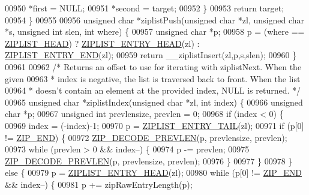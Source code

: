 \begin{DoxyCode}
{{00950         *first = NULL;
00951         *second = target;
00952     \}
00953     \textcolor{keywordflow}{return} target;
00954 \}
00955 
00956 \textcolor{keywordtype}{unsigned} \textcolor{keywordtype}{char} *ziplistPush(\textcolor{keywordtype}{unsigned} \textcolor{keywordtype}{char} *zl, \textcolor{keywordtype}{unsigned} \textcolor{keywordtype}{char} *s, \textcolor{keywordtype}{unsigned} \textcolor{keywordtype}{int} slen, \textcolor{keywordtype}{int} where) \{
00957     \textcolor{keywordtype}{unsigned} \textcolor{keywordtype}{char} *p;
00958     p = (where == \hyperlink{ziplist_8h_a88d32e547c509220e1c50cd9306186ba}{ZIPLIST\_HEAD}) ? \hyperlink{ziplist_8c_a4f6c9857a0ae335f2c4b214b63b5a6c8}{ZIPLIST\_ENTRY\_HEAD}(zl) : 
      \hyperlink{ziplist_8c_a6e98a67acf629dd869bb532a1d339ccd}{ZIPLIST\_ENTRY\_END}(zl);
00959     \textcolor{keywordflow}{return} \_\_ziplistInsert(zl,p,s,slen);
00960 \}
00961 
00962 \textcolor{comment}{/* Returns an offset to use for iterating with ziplistNext. When the given}
00963 \textcolor{comment}{ * index is negative, the list is traversed back to front. When the list}
00964 \textcolor{comment}{ * doesn't contain an element at the provided index, NULL is returned. */}
00965 \textcolor{keywordtype}{unsigned} \textcolor{keywordtype}{char} *ziplistIndex(\textcolor{keywordtype}{unsigned} \textcolor{keywordtype}{char} *zl, \textcolor{keywordtype}{int} index) \{
00966     \textcolor{keywordtype}{unsigned} \textcolor{keywordtype}{char} *p;
00967     \textcolor{keywordtype}{unsigned} \textcolor{keywordtype}{int} prevlensize, prevlen = 0;
00968     \textcolor{keywordflow}{if} (index < 0) \{
00969         index = (-index)-1;
00970         p = \hyperlink{ziplist_8c_a13a02cab4315ab94186102584601273e}{ZIPLIST\_ENTRY\_TAIL}(zl);
00971         \textcolor{keywordflow}{if} (p[0] != \hyperlink{ziplist_8c_a31a8f9d5b5bad75318741cfca5de5ea8}{ZIP\_END}) \{
00972             \hyperlink{ziplist_8c_a3e5b2bc4707dc1097db2726494cc3728}{ZIP\_DECODE\_PREVLEN}(p, prevlensize, prevlen);
00973             \textcolor{keywordflow}{while} (prevlen > 0 && index--) \{
00974                 p -= prevlen;
00975                 \hyperlink{ziplist_8c_a3e5b2bc4707dc1097db2726494cc3728}{ZIP\_DECODE\_PREVLEN}(p, prevlensize, prevlen);
00976             \}
00977         \}
00978     \} \textcolor{keywordflow}{else} \{
00979         p = \hyperlink{ziplist_8c_a4f6c9857a0ae335f2c4b214b63b5a6c8}{ZIPLIST\_ENTRY\_HEAD}(zl);
00980         \textcolor{keywordflow}{while} (p[0] != \hyperlink{ziplist_8c_a31a8f9d5b5bad75318741cfca5de5ea8}{ZIP\_END} && index--) \{
00981             p += zipRawEntryLength(p);
}}
\end{DoxyCode}
